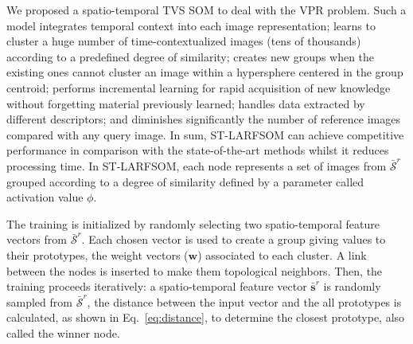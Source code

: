 \documentclass[letterpaper, 10 pt, conference]{ieeeconf}  %
\begin{document}
We proposed a spatio-temporal TVS SOM to deal with the VPR problem. Such a model integrates temporal context into each image representation; learns to cluster a huge number of time-contextualized images (tens of thousands) according to a predefined degree of similarity; creates new groups when the existing ones cannot cluster an image within a hypersphere centered in the group centroid; performs incremental learning for rapid acquisition of new knowledge without forgetting material previously learned; handles data extracted by different descriptors; and diminishes significantly the number of reference images compared with any query image. In sum, ST-LARFSOM can achieve competitive performance in comparison with the state-of-the-art methods whilst it reduces processing time. In ST-LARFSOM, each node represents a set of images from $\mathcal{\bar{S}}^r$ grouped according to a degree of similarity defined by a parameter called activation value $\phi$.






The training is initialized by randomly selecting two spatio-temporal feature vectors from $\mathcal{\bar{S}}^r$. Each chosen vector is used to create a group giving values to their prototypes, the weight vectors ($\mathbf{w}$) associated to each cluster. A link between the nodes is inserted to make them topological neighbors. Then, the training proceeds iteratively: a spatio-temporal feature vector $\bar{\mathbf{s}}^{r}$ is randomly sampled from $\mathcal{\bar{S}}^r$, the distance between the input vector and the all prototypes is calculated, as shown in Eq.~\eqref{eq:distance}, to determine the closest prototype, also called the winner node. 
\end{document}
